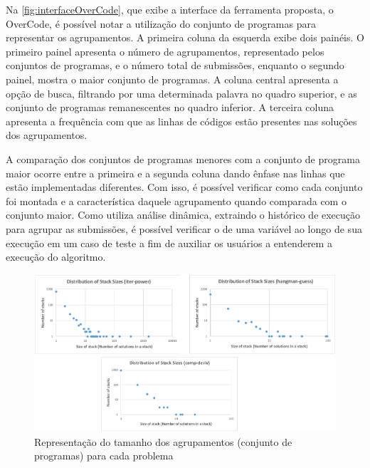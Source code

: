 		Na \cref{fig:interfaceOverCode}, que exibe a interface da ferramenta proposta,
		o OverCode, é possível notar a utilização do conjunto de programas para
		representar os agrupamentos. A primeira coluna da esquerda exibe dois painéis.
		O primeiro painel apresenta o número de agrupamentos, representado pelos conjuntos de programas,
		e o número total de submissões, enquanto o segundo painel, mostra o maior
		conjunto de programas. A coluna central apresenta a opção de busca, filtrando
		por uma determinada palavra no quadro superior, e as conjunto de programas remanescentes no
		quadro inferior. A terceira coluna apresenta a frequência com que as linhas
		de códigos estão presentes nas soluções dos agrupamentos.

		A comparação dos conjuntos de programas menores com a conjunto de programa maior ocorre entre
		a primeira e a segunda coluna dando ênfase nas linhas que estão implementadas
		diferentes. Com isso, é possível verificar como cada conjunto foi montada e a
		característica daquele agrupamento quando comparada com o conjunto maior. Como
		utiliza análise dinâmica, extraindo o histórico de execução para agrupar as
		submissões, é possível verificar o  de uma variável ao longo de
		sua execução em um caso de teste a fim de auxiliar os usuários a entenderem a
		execução do algoritmo.
		
		\begin{figure}[h]
			\centering
			\includegraphics[width=1\linewidth]{imagem/OverCodeDistri}
			\caption[Representação do tamanho dos agrupamentos (conjunto de programas) para cada problema]
			{Representação do tamanho dos agrupamentos (conjunto de programas) para cada problema
				\cite{Glassman:2015}}
			\label{fig:OverCodeDistri}
		\end{figure}

